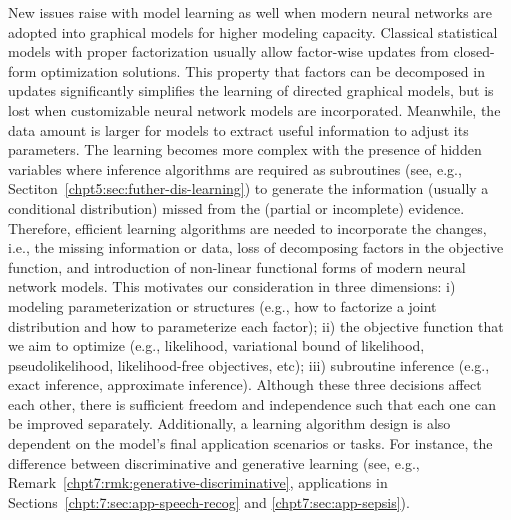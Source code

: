 New issues raise with model learning as well when modern neural networks are adopted into graphical models for higher modeling capacity. Classical statistical models with proper factorization usually allow factor-wise updates from closed-form optimization solutions. This property that factors can be decomposed in updates significantly simplifies the learning of directed graphical models, but is lost when customizable neural network models are incorporated. Meanwhile, the data amount is larger for models to extract useful information to adjust its parameters. The learning becomes more complex with the presence of hidden variables where inference algorithms are required as subroutines (see, e.g., Sectiton~\ref{chpt5:sec:futher-dis-learning}) to generate the information (usually a conditional distribution) missed from the (partial or incomplete) evidence.
Therefore, efficient learning algorithms are needed to incorporate the changes, i.e., the missing information or data, loss of decomposing factors in the objective function, and introduction of non-linear functional forms of modern neural network models. This motivates our consideration in three dimensions: i) modeling parameterization or structures (e.g., how to factorize a joint distribution and how to parameterize each factor); ii) the objective function that we aim to optimize (e.g., likelihood, variational bound of likelihood, pseudolikelihood, likelihood-free objectives, etc); iii) subroutine inference (e.g., exact inference, approximate inference). Although these three decisions affect each other, there is sufficient freedom and independence such that each one can be improved separately. Additionally, a learning algorithm design is also dependent on the model's final application scenarios or tasks. For instance, the difference between discriminative and generative learning (see, e.g., Remark~\ref{chpt7:rmk:generative-discriminative}, applications in Sections~\ref{chpt:7:sec:app-speech-recog} and \ref{chpt7:sec:app-sepsis}).


